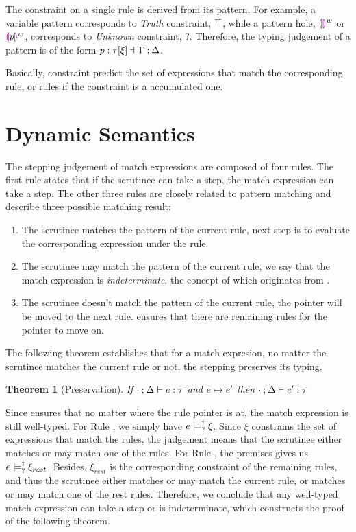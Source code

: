 \documentclass[acmsmall,screen,review,nonacm]{acmart}
\theoremstyle{slplain}
\newtheorem{thm}{Theorem}  %
\numberwithin{thm}{section}
\begin{document}
The constraint on a single rule is derived from its pattern. For example, a variable pattern corresponds to \emph{Truth} constraint, $\top$, while a pattern hole, $\textcolor{violet}{\llparenthesis}\textcolor{violet}{\rrparenthesis}^{w}$ or $\textcolor{violet}{\llparenthesis} p\textcolor{violet}{\rrparenthesis}^{w}$, corresponds to \emph{Unknown} constraint, $?$.
Therefore, the typing judgement of a pattern is of the form $\chpattyp{p}{\tau}{\xi}{\Gamma}{\Delta}$.

Basically, constraint predict the set of expressions that match the corresponding rule, or rules if the constraint is a accumulated one.

\section{Dynamic Semantics}
\label{sec:dynamics}

The stepping judgement of match expressions are composed of four rules. The first rule states that if the scrutinee can take a step, the match expression can take a step. The other three rules are closely related to pattern matching and describe three possible matching result:
\begin{enumerate}
  \item The scrutinee matches the pattern of the current rule, next step is to evaluate the corresponding expression under the rule.
  \item The scrutinee may match the pattern of the current rule, we say that the match expression is \emph{indeterminate}, the concept of which originates from \citet{DBLP:journals/pacmpl/OmarVCH19}.
  \item The scrutinee doesn't match the pattern of the current rule, the pointer will be moved to the next rule.  ensures that there are remaining rules for the pointer to move on.
\end{enumerate}

The following theorem establishes that for a match expresion, no matter the scrutinee matches the current rule or not, the stepping preserves its typing.

\begin{thm}[Preservation]
  \label{thrm:preservation}
  If $\cdot \mathbin{;} \Delta \vdash e : \tau$ and $e \mapsto e'$
  then $\cdot \mathbin{;} \Delta \vdash e' : \tau$
\end{thm}

Since  ensures that no matter where the rule pointer is at, the match expression is still well-typed.
For Rule \TMatchZPre, we simply have $e \models_{?}^{\dag} \xi$. Since $\xi$ constrains the set of expressions that match the rules, the judgement means that the scrutinee either matches or may match one of the rules.
For Rule \TMatchNZPre, the premises gives us $e \models_{?}^{\dag} \xi_{rest}$. Besides, $\xi_{rest}$ is the corresponding constraint of the remaining rules, and thus the scrutinee either matches or may match the current rule, or matches or may match one of the rest rules.
Therefore, we conclude that any well-typed match expression can take a step or is indeterminate, which constructs the proof of the following theorem.
\end{document}
